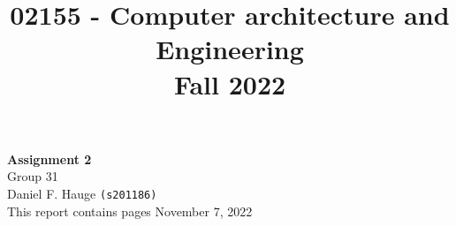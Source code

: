 \documentclass[a4paper]{article}
\begin{document}
\title{02155 - Computer architecture and Engineering\\Fall 2022}
\author{
}
\date{} %
\color{black}
\maketitle

\begin{center}
    { \huge \bfseries Assignment 2}\\
    
    \vspace{1.25cm}
    Group 31\\
    \vspace{.25cm}
    Daniel F. Hauge \texttt{(s201186)}\\
    
    \vspace{6cm}
    This report contains \pageref{LastPage} pages
    \vspace{.25cm}
    \vfill
    November 7, 2022
\end{center}


\medskip
\newpage


\end{document}
